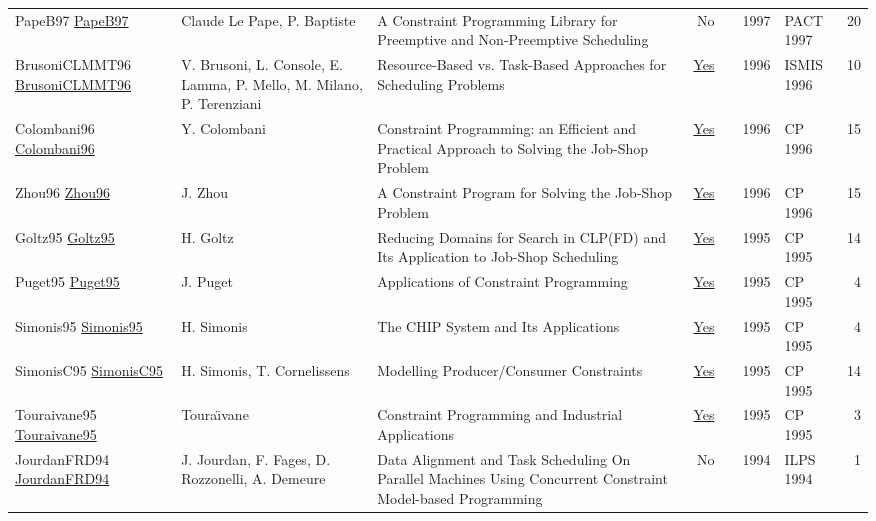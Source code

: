 {\begin{longtable}{p{3cm}p{6cm}p{7cm}rrrp{3cm}r}
PapeB97 \href{}{PapeB97} & Claude Le Pape, P. Baptiste & A Constraint Programming Library for Preemptive and Non-Preemptive Scheduling & No & \cite{PapeB97} & 1997 & PACT 1997 & 20\\
BrusoniCLMMT96 \href{https://doi.org/10.1007/3-540-61286-6\_157}{BrusoniCLMMT96} & V. Brusoni, L. Console, E. Lamma, P. Mello, M. Milano, P. Terenziani & Resource-Based vs. Task-Based Approaches for Scheduling Problems & \href{papers/BrusoniCLMMT96.pdf}{Yes} & \cite{BrusoniCLMMT96} & 1996 & ISMIS 1996 & 10\\
Colombani96 \href{https://doi.org/10.1007/3-540-61551-2\_72}{Colombani96} & Y. Colombani & Constraint Programming: an Efficient and Practical Approach to Solving the Job-Shop Problem & \href{papers/Colombani96.pdf}{Yes} & \cite{Colombani96} & 1996 & CP 1996 & 15\\
Zhou96 \href{https://doi.org/10.1007/3-540-61551-2\_97}{Zhou96} & J. Zhou & A Constraint Program for Solving the Job-Shop Problem & \href{papers/Zhou96.pdf}{Yes} & \cite{Zhou96} & 1996 & CP 1996 & 15\\
Goltz95 \href{https://doi.org/10.1007/3-540-60299-2\_33}{Goltz95} & H. Goltz & Reducing Domains for Search in {CLP(FD)} and Its Application to Job-Shop Scheduling & \href{papers/Goltz95.pdf}{Yes} & \cite{Goltz95} & 1995 & CP 1995 & 14\\
Puget95 \href{https://doi.org/10.1007/3-540-60299-2\_43}{Puget95} & J. Puget & Applications of Constraint Programming & \href{papers/Puget95.pdf}{Yes} & \cite{Puget95} & 1995 & CP 1995 & 4\\
Simonis95 \href{https://doi.org/10.1007/3-540-60299-2\_42}{Simonis95} & H. Simonis & The {CHIP} System and Its Applications & \href{papers/Simonis95.pdf}{Yes} & \cite{Simonis95} & 1995 & CP 1995 & 4\\
SimonisC95 \href{https://doi.org/10.1007/3-540-60299-2\_27}{SimonisC95} & H. Simonis, T. Cornelissens & Modelling Producer/Consumer Constraints & \href{papers/SimonisC95.pdf}{Yes} & \cite{SimonisC95} & 1995 & CP 1995 & 14\\
Touraivane95 \href{https://doi.org/10.1007/3-540-60299-2\_41}{Touraivane95} & Toura{\"{\i}}vane & Constraint Programming and Industrial Applications & \href{papers/Touraivane95.pdf}{Yes} & \cite{Touraivane95} & 1995 & CP 1995 & 3\\
JourdanFRD94 \href{}{JourdanFRD94} & J. Jourdan, F. Fages, D. Rozzonelli, A. Demeure & Data Alignment and Task Scheduling On Parallel Machines Using Concurrent Constraint Model-based Programming & No & \cite{JourdanFRD94} & 1994 & ILPS 1994 & 1\\

\end{longtable}}
